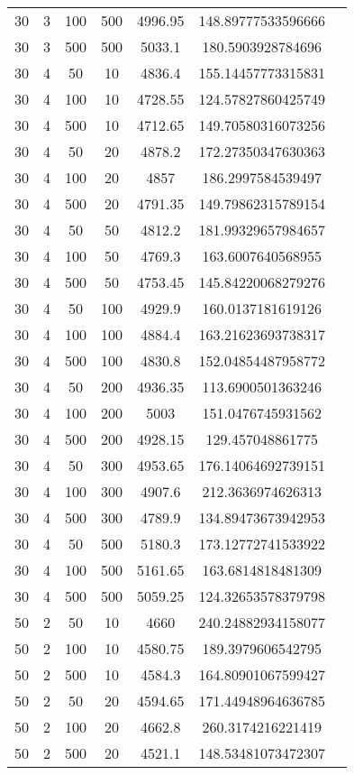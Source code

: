 {\begin{longtabu}{S
S
S
S
S
S[round-mode=places, round-precision=0]
S[round-mode=places, round-precision=0]}
30 & 3 & 100 & 500 & 4996.95 & 148.89777533596666 \\
30 & 3 & 500 & 500 & 5033.1 & 180.5903928784696 \\
30 & 4 & 50 & 10 & 4836.4 & 155.14457773315831 \\
30 & 4 & 100 & 10 & 4728.55 & 124.57827860425749 \\
30 & 4 & 500 & 10 & 4712.65 & 149.70580316073256 \\
30 & 4 & 50 & 20 & 4878.2 & 172.27350347630363 \\
30 & 4 & 100 & 20 & 4857 & 186.2997584539497 \\
30 & 4 & 500 & 20 & 4791.35 & 149.79862315789154 \\
30 & 4 & 50 & 50 & 4812.2 & 181.99329657984657 \\
30 & 4 & 100 & 50 & 4769.3 & 163.6007640568955 \\
30 & 4 & 500 & 50 & 4753.45 & 145.84220068279276 \\
30 & 4 & 50 & 100 & 4929.9 & 160.0137181619126 \\
30 & 4 & 100 & 100 & 4884.4 & 163.21623693738317 \\
30 & 4 & 500 & 100 & 4830.8 & 152.04854487958772 \\
30 & 4 & 50 & 200 & 4936.35 & 113.6900501363246 \\
30 & 4 & 100 & 200 & 5003 & 151.0476745931562 \\
30 & 4 & 500 & 200 & 4928.15 & 129.457048861775 \\
30 & 4 & 50 & 300 & 4953.65 & 176.14064692739151 \\
30 & 4 & 100 & 300 & 4907.6 & 212.3636974626313 \\
30 & 4 & 500 & 300 & 4789.9 & 134.89473673942953 \\
30 & 4 & 50 & 500 & 5180.3 & 173.12772741533922 \\
30 & 4 & 100 & 500 & 5161.65 & 163.6814818481309 \\
30 & 4 & 500 & 500 & 5059.25 & 124.32653578379798 \\
50 & 2 & 50 & 10 & 4660 & 240.24882934158077 \\
50 & 2 & 100 & 10 & 4580.75 & 189.3979606542795 \\
50 & 2 & 500 & 10 & 4584.3 & 164.80901067599427 \\
50 & 2 & 50 & 20 & 4594.65 & 171.44948964636785 \\
50 & 2 & 100 & 20 & 4662.8 & 260.3174216221419 \\
50 & 2 & 500 & 20 & 4521.1 & 148.53481073472307 \\

\end{longtabu}}

